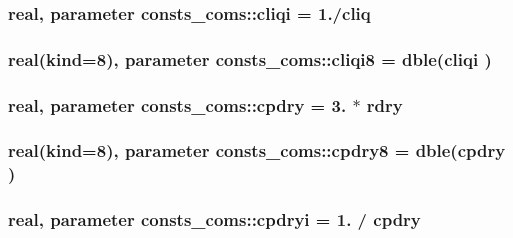 \subsubsection[{\texorpdfstring{cliqi}{cliqi}}]{\setlength{\rightskip}{0pt plus 5cm}real, parameter consts\+\_\+coms\+::cliqi = 1./{\bf cliq}}\hypertarget{namespaceconsts__coms_aef968d7aee293bda6bc13f116d5b0de3}{}\label{namespaceconsts__coms_aef968d7aee293bda6bc13f116d5b0de3}
\subsubsection[{\texorpdfstring{cliqi8}{cliqi8}}]{\setlength{\rightskip}{0pt plus 5cm}real(kind=8), parameter consts\+\_\+coms\+::cliqi8 = dble({\bf cliqi} )}\hypertarget{namespaceconsts__coms_a176ea09f14460ae7d396f53f93d59b55}{}\label{namespaceconsts__coms_a176ea09f14460ae7d396f53f93d59b55}
\subsubsection[{\texorpdfstring{cpdry}{cpdry}}]{\setlength{\rightskip}{0pt plus 5cm}real, parameter consts\+\_\+coms\+::cpdry = 3. $\ast$ {\bf rdry}}\hypertarget{namespaceconsts__coms_a1d31bf978b711e0b276c563e2bed88f0}{}\label{namespaceconsts__coms_a1d31bf978b711e0b276c563e2bed88f0}
\subsubsection[{\texorpdfstring{cpdry8}{cpdry8}}]{\setlength{\rightskip}{0pt plus 5cm}real(kind=8), parameter consts\+\_\+coms\+::cpdry8 = dble({\bf cpdry} )}\hypertarget{namespaceconsts__coms_a2bd3379eb46c1712c4f3d3a4d8cd2725}{}\label{namespaceconsts__coms_a2bd3379eb46c1712c4f3d3a4d8cd2725}
\subsubsection[{\texorpdfstring{cpdryi}{cpdryi}}]{\setlength{\rightskip}{0pt plus 5cm}real, parameter consts\+\_\+coms\+::cpdryi = 1. / {\bf cpdry}}\hypertarget{namespaceconsts__coms_a10e4ab661d502a2925676615fcff8f53}{}\label{namespaceconsts__coms_a10e4ab661d502a2925676615fcff8f53}
